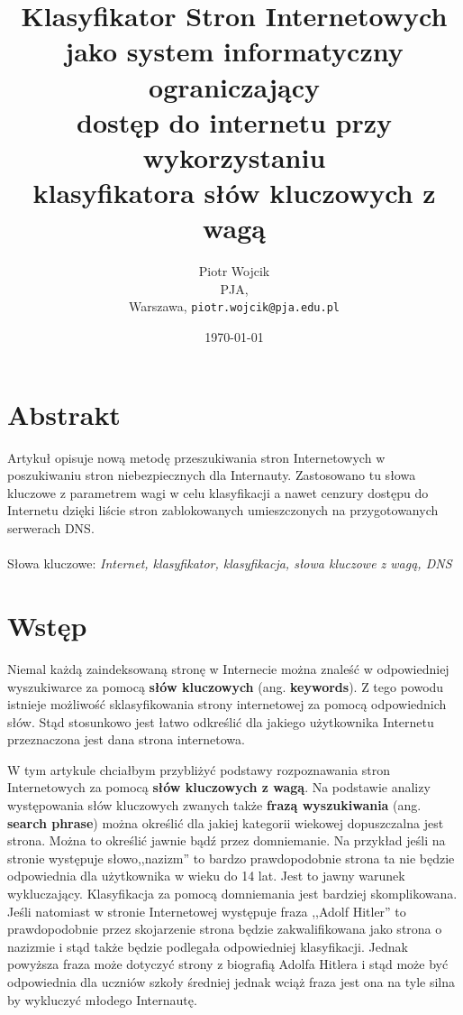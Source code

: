 \documentclass[10pt,twoside,a4paper]{article}
\title{Klasyfikator Stron Internetowych\\ jako system informatyczny ograniczający\\ dostęp do internetu przy wykorzystaniu\\ klasyfikatora słów kluczowych z wagą\\}
\author{Piotr Wojcik\\
    PJA,\\
    Warszawa,
    \texttt{piotr.wojcik@pja.edu.pl}}
\date{\today}
\begin{document}
\maketitle



\section{Abstrakt}
\indent Artykuł opisuje nową metodę przeszukiwania stron Internetowych w poszukiwaniu stron niebezpiecznych dla Internauty. Zastosowano tu słowa kluczowe z parametrem wagi w celu klasyfikacji a nawet cenzury dostępu do Internetu dzięki liście stron zablokowanych umieszczonych na przygotowanych serwerach DNS.\\
\\
Słowa kluczowe:
\textit{Internet, klasyfikator, klasyfikacja, słowa kluczowe z wagą, DNS}

\section{Wstęp}

\indent Niemal każdą zaindeksowaną stronę w Internecie można znaleść w odpowiedniej wyszukiwarce za pomocą \textbf{słów kluczowych} (ang.\textbf{ keywords}). Z tego powodu istnieje możliwość sklasyfikowania strony internetowej za pomocą odpowiednich słów. Stąd stosunkowo jest łatwo odkreślić dla jakiego użytkownika Internetu przeznaczona jest dana strona internetowa.

W tym artykule chciałbym przybliżyć podstawy rozpoznawania stron Internetowych za pomocą \textbf{słów kluczowych z wagą}. Na podstawie analizy występowania słów kluczowych zwanych także \textbf{frazą wyszukiwania} (ang. \textbf{search phrase}) można określić dla jakiej kategorii wiekowej dopuszczalna jest strona. Można to określić jawnie bądź przez domniemanie. Na przykład jeśli na stronie występuje słowo,,nazizm'' to bardzo prawdopodobnie strona ta nie będzie odpowiednia dla użytkownika w wieku do 14 lat. Jest to jawny warunek wykluczający. Klasyfikacja za pomocą domniemania jest bardziej skomplikowana. Jeśli natomiast w stronie Internetowej występuje fraza ,,Adolf Hitler'' to prawdopodobnie przez skojarzenie strona będzie zakwalifikowana jako strona o nazizmie i stąd także będzie podlegała odpowiedniej klasyfikacji. Jednak powyższa fraza może dotyczyć strony z biografią Adolfa Hitlera i stąd może być odpowiednia dla uczniów szkoły średniej jednak wciąż fraza jest ona na tyle silna by wykluczyć młodego Internautę. 
\end{document}
